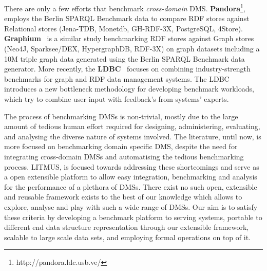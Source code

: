 \documentclass{llncs}
\newcommand{\todoproofread}[3]{
    \todoitemtemplate{#1}{#2}{Please proof read above section; #3}{inline}{yellow}
}
\newcommand{\todoitemtemplate}[5]{%
\todo[#4,color=#5,caption=X]{{#1}{ \textbf{{\tiny{for}} #2}:}{#3}}%
}
\begin{document}
    
    There are only a few efforts that benchmark \textit{cross-domain} DMS. \textbf{Pandora}\footnote{http://pandora.ldc.usb.ve/}, employs the Berlin SPARQL Benchmark data to compare RDF stores against Relational stores (Jena-TDB, Monetdb, GH-RDF-3X, PostgreSQL, 4Store). 
    \textbf{Graphium}~\cite{flores2013graphium} is a similar study benchmarking RDF stores against Graph stores (Neo4J, Sparksee/DEX, HypergraphDB, RDF-3X) on graph datasets including a 10M triple graph data generated using the Berlin SPARQL Benchmark data generator. More recently, the \textbf{LDBC}~\cite{DBLP:journals/sigmod/AnglesBLF0ENMKT14} focuses on combining industry-strength benchmarks for graph and RDF data management systems.
    The LDBC introduces a new bottleneck methodology for developing benchmark workloads, which try to combine user input with feedback's from systems' experts.%
    
    The process of benchmarking DMSs is non-trivial, mostly due to the large amount of tedious human effort required for designing, administering, evaluating, and analysing the diverse nature of systems involved. The literature, until now, is more focused on benchmarking domain specific DMS, despite the need for integrating cross-domain DMSs and automatising the tedious benchmarking process. LITMUS, is focused towards addressing these shortcomings and serve as a open extensible platform to allow easy integration, benchmarking and analysis for the performance of a plethora of DMSs. There exist no such open, extensible and reusable framework exists to the best of our knowledge which allows to explore, analyse and play with such a wide range of DMSs.
    Our aim is to satisfy these criteria by developing a benchmark platform to serving systems, portable to different end data structure representation through our extensible framework, scalable to large scale data sets, and employing formal operations on top of it.
    
    

    
        
\end{document}
